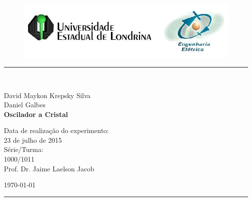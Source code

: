 \begin{titlepage}
\begin{center}
\begin{figure}[h]
\includegraphics[scale=0.76]{Imagens/topdotitulo.png}
\end{figure}
\rule{\columnwidth}{1.5mm}
\

\large David Maykon Krepsky Silva\\
\large Daniel Galbes\\

\vspace{4cm}
{\bf \Large Oscilador a Cristal}
\vspace{3.5cm}

\begin{flushright}
Data de realização do experimento:\\
23 de julho de 2015\\
Série/Turma:\\
1000/1011\\
Prof. Dr. Jaime Laelson Jacob 
\end{flushright}

\vspace{3.2cm}
\today

\rule{\columnwidth}{1.3mm}
\end{center}
\end{titlepage}
\blankpage